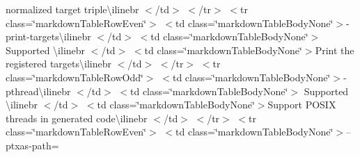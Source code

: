 \begin{longtabu}
normalized target triple{\ttfamily \textbackslash{}ilinebr \texorpdfstring{$<$}{<}/td\texorpdfstring{$>$}{>} \texorpdfstring{$<$}{<}/tr\texorpdfstring{$>$}{>} \texorpdfstring{$<$}{<}tr class=\char`\"{}markdown\+Table\+Row\+Even\char`\"{}\texorpdfstring{$>$}{>} \texorpdfstring{$<$}{<}td class=\char`\"{}markdown\+Table\+Body\+None\char`\"{}\texorpdfstring{$>$}{>}}-\/print-\/targets{\ttfamily \textbackslash{}ilinebr \texorpdfstring{$<$}{<}/td\texorpdfstring{$>$}{>} \texorpdfstring{$<$}{<}td class=\char`\"{}markdown\+Table\+Body\+None\char`\"{}\texorpdfstring{$>$}{>} Supported \textbackslash{}ilinebr \texorpdfstring{$<$}{<}/td\texorpdfstring{$>$}{>} \texorpdfstring{$<$}{<}td class=\char`\"{}markdown\+Table\+Body\+None\char`\"{}\texorpdfstring{$>$}{>}}Print the registered targets{\ttfamily \textbackslash{}ilinebr \texorpdfstring{$<$}{<}/td\texorpdfstring{$>$}{>} \texorpdfstring{$<$}{<}/tr\texorpdfstring{$>$}{>} \texorpdfstring{$<$}{<}tr class=\char`\"{}markdown\+Table\+Row\+Odd\char`\"{}\texorpdfstring{$>$}{>} \texorpdfstring{$<$}{<}td class=\char`\"{}markdown\+Table\+Body\+None\char`\"{}\texorpdfstring{$>$}{>}}-\/pthread{\ttfamily \textbackslash{}ilinebr \texorpdfstring{$<$}{<}/td\texorpdfstring{$>$}{>} \texorpdfstring{$<$}{<}td class=\char`\"{}markdown\+Table\+Body\+None\char`\"{}\texorpdfstring{$>$}{>} Supported \textbackslash{}ilinebr \texorpdfstring{$<$}{<}/td\texorpdfstring{$>$}{>} \texorpdfstring{$<$}{<}td class=\char`\"{}markdown\+Table\+Body\+None\char`\"{}\texorpdfstring{$>$}{>}}Support POSIX threads in generated code{\ttfamily \textbackslash{}ilinebr \texorpdfstring{$<$}{<}/td\texorpdfstring{$>$}{>} \texorpdfstring{$<$}{<}/tr\texorpdfstring{$>$}{>} \texorpdfstring{$<$}{<}tr class=\char`\"{}markdown\+Table\+Row\+Even\char`\"{}\texorpdfstring{$>$}{>} \texorpdfstring{$<$}{<}td class=\char`\"{}markdown\+Table\+Body\+None\char`\"{}\texorpdfstring{$>$}{>}}--ptxas-\/path=


\end{longtabu}
